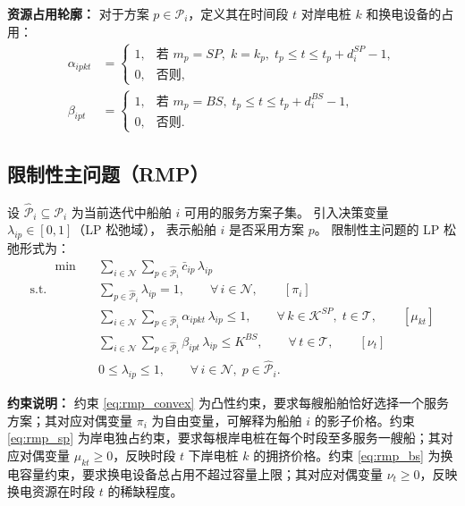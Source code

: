 \documentclass[UTF8, a4paper, 12pt]{ctexart}
\begin{document}
\medskip
\noindent\textbf{资源占用轮廓：}
对于方案 $p \in \mathcal{P}_i$，定义其在时间段 $t$ 对岸电桩 $k$ 和换电设备的占用：
\begin{align}
  \alpha_{ipkt} &=
  \begin{cases}
    1, & \text{若 } m_p = SP,\; k = k_p,\;
         t_p \le t \le t_p + d_i^{SP} - 1, \\
    0, & \text{否则},
  \end{cases}
  \label{eq:col_alpha} \\
  \beta_{ipt} &=
  \begin{cases}
    1, & \text{若 } m_p = BS,\;
         t_p \le t \le t_p + d_i^{BS} - 1, \\
    0, & \text{否则}.
  \end{cases}
  \label{eq:col_beta}
\end{align}

\subsection{限制性主问题（RMP）}
\label{sec:cg_rmp}

设 $\hat{\mathcal{P}}_i \subseteq \mathcal{P}_i$ 为当前迭代中船舶 $i$
可用的服务方案子集。
引入决策变量 $\lambda_{ip} \in [0,1]$（LP 松弛域），
表示船舶 $i$ 是否采用方案 $p$。
限制性主问题的 LP 松弛形式为：
\begin{align}
  [\text{RMP}] \qquad
  \min \quad & \sum_{i \in \mathcal{N}} \sum_{p \in \hat{\mathcal{P}}_i}
    \bar{c}_{ip}\, \lambda_{ip}
  \label{eq:rmp_obj} \\
  \text{s.t.} \quad
  & \sum_{p \in \hat{\mathcal{P}}_i} \lambda_{ip} = 1,
    \qquad \forall\, i \in \mathcal{N},
    \qquad [\pi_i]
  \label{eq:rmp_convex} \\
  & \sum_{i \in \mathcal{N}} \sum_{p \in \hat{\mathcal{P}}_i}
    \alpha_{ipkt}\, \lambda_{ip} \le 1,
    \qquad \forall\, k \in \mathcal{K}^{SP},\; t \in \mathcal{T},
    \qquad [\mu_{kt}]
  \label{eq:rmp_sp} \\
  & \sum_{i \in \mathcal{N}} \sum_{p \in \hat{\mathcal{P}}_i}
    \beta_{ipt}\, \lambda_{ip} \le K^{BS},
    \qquad \forall\, t \in \mathcal{T},
    \qquad [\nu_t]
  \label{eq:rmp_bs} \\
  & 0 \le \lambda_{ip} \le 1,
    \qquad \forall\, i \in \mathcal{N},\; p \in \hat{\mathcal{P}}_i.
  \label{eq:rmp_bound}
\end{align}

\noindent\textbf{约束说明：}
约束 \eqref{eq:rmp_convex} 为凸性约束，要求每艘船舶恰好选择一个服务方案；其对应对偶变量 $\pi_i$ 为自由变量，可解释为船舶 $i$ 的影子价格。约束 \eqref{eq:rmp_sp} 为岸电独占约束，要求每根岸电桩在每个时段至多服务一艘船；其对应对偶变量 $\mu_{kt} \ge 0$，反映时段 $t$ 下岸电桩 $k$ 的拥挤价格。约束 \eqref{eq:rmp_bs} 为换电容量约束，要求换电设备总占用不超过容量上限；其对应对偶变量 $\nu_t \ge 0$，反映换电资源在时段 $t$ 的稀缺程度。
\end{document}
